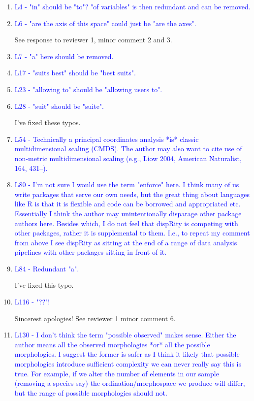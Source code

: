 \documentclass[12pt,letterpaper]{article}
\begin{document}
\begin{enumerate}

\item{\textcolor{blue}{L4 - "in" should be "to"? "of variables" is then redundant and can be removed.}}
\item{\textcolor{blue}{L6 - "are the axis of this space" could just be "are the axes".}}

See response to reviewer 1, minor comment 2 and 3.

\item{\textcolor{blue}{L7 - "a" here should be removed.}}
\item{\textcolor{blue}{L17 - "suits best" should be "best suits".}}
\item{\textcolor{blue}{L23 - "allowing to" should be "allowing users to".}}
\item{\textcolor{blue}{L28 - "suit" should be "suite".}}

I've fixed these typos.


\item{\textcolor{blue}{L54 - Technically a principal coordinates analysis *is* classic multidimensional scaling (CMDS). The author may also want to cite use of non-metric multidimensional scaling (e.g., Liow 2004, American Naturalist, 164, 431–).}}


\item{\textcolor{blue}{L80 - I'm not sure I would use the term "enforce" here. I think many of us write packages that serve our own needs, but the great thing about languages like R is that it is flexible and code can be borrowed and appropriated etc. Essentially I think the author may unintentionally disparage other package authors here. Besides which, I do not feel that dispRity is competing with other packages, rather it is supplemental to them. I.e., to repeat my comment from above I see dispRity as sitting at the end of a range of data analysis pipelines with other packages sitting in front of it.}}


\item{\textcolor{blue}{L84 - Redundant "a".}}

I've fixed this typo.

\item{\textcolor{blue}{L116 - "??"!}}

Sincerest apologies! See reviewer 1 minor comment 6.

\item{\textcolor{blue}{L130 - I don't think the term "possible observed" makes sense. Either the author means all the observed morphologies *or* all the possible morphologies. I suggest the former is safer as I think it likely that possible morphologies introduce sufficient complexity we can never really say this is true. For example, if we alter the number of elements in our sample (removing a species say) the ordination/morphospace we produce will differ, but the range of possible morphologies should not.}}


\end{enumerate}
\end{document}
